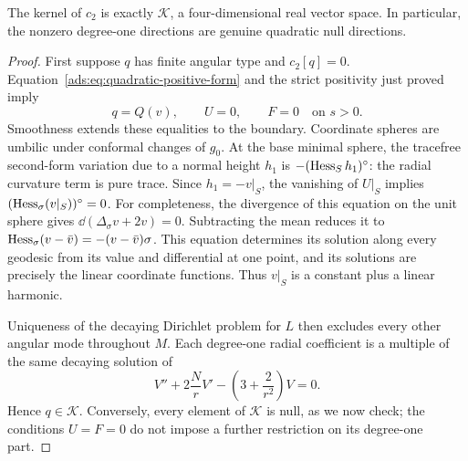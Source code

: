 \begin{corollary}
\label{ads:cor:kernel}
The kernel of $c_2$ is exactly $\mathcal K$, a four-dimensional real
vector space.  In particular, the nonzero degree-one directions are
genuine quadratic null directions.
\end{corollary}

\begin{proof}
First suppose $q$ has finite angular type and $c_2[q]=0$.
Equation~\eqref{ads:eq:quadratic-positive-form} and the strict positivity
just proved imply
\begin{equation}
 q=Q(v),\qquad U=0,\qquad F=0
 \quad\text{on }s>0.
 \label{ads:eq:quadratic-equality-conditions}
\end{equation}
Smoothness extends these equalities to the boundary.  Coordinate
spheres are umbilic under conformal changes of $g_0$.  At the base
minimal sphere, the tracefree second-form variation due to a normal
height $h_1$ is $-(\operatorname{Hess}_Sh_1)^{\circ}$: the radial curvature term is
pure trace.  Since $h_1=-v|_S$, the vanishing of $U|_S$ implies
$(\operatorname{Hess}_\sigma(v|_S))^{\circ}=0$.
For completeness, the divergence of this equation on the unit sphere
gives $\dd(\Delta_\sigma v+2v)=0$.  Subtracting the mean reduces it to
$\operatorname{Hess}_\sigma(v-\bar v)=-(v-\bar v)\sigma$.
This equation determines its solution along every geodesic from its
value and differential at one point, and its solutions are precisely
the linear coordinate functions.  Thus $v|_S$ is a constant plus a
linear harmonic.

Uniqueness of the decaying Dirichlet problem for $L$ then excludes
every other angular mode throughout $M$.  Each degree-one radial
coefficient is a multiple of the same decaying solution of
\begin{equation}
 V''+2\frac NrV'-\left(3+\frac2{r^2}\right)V=0.
 \label{ads:eq:dipole-radial-ode}
\end{equation}
Hence $q\in\mathcal K$.  Conversely, every element of $\mathcal K$
is null, as we now check; the conditions $U=F=0$ do not impose a further
restriction on its degree-one part.


\end{proof}
